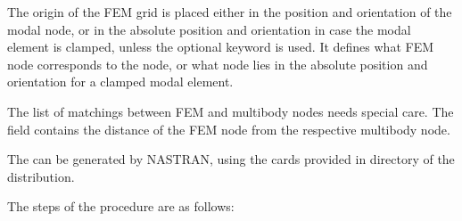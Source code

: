 \noindent
The origin of the FEM grid is placed either in the position and orientation 
of the modal node, or in the absolute position and orientation 
in case the modal element is clamped, unless the  
optional keyword is used.
It defines what FEM node corresponds to the  node,
or what node lies in the absolute position and orientation
for a clamped modal element.

\noindent
The list of matchings between FEM and multibody nodes needs
special care.
The  field contains the distance
of the FEM node from the respective multibody node.

\noindent
The  can be generated by NASTRAN, using
the  cards provided in directory  
of the distribution.

The steps of the procedure are as follows:
